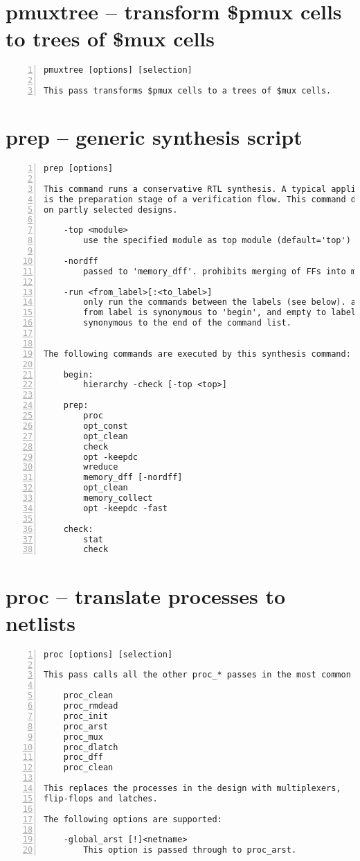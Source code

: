 \section{pmuxtree -- transform \$pmux cells to trees of \$mux cells}
\label{cmd:pmuxtree}
\begin{lstlisting}[numbers=left,frame=single]
    pmuxtree [options] [selection]

This pass transforms $pmux cells to a trees of $mux cells.
\end{lstlisting}

\section{prep -- generic synthesis script}
\label{cmd:prep}
\begin{lstlisting}[numbers=left,frame=single]
    prep [options]

This command runs a conservative RTL synthesis. A typical application for this
is the preparation stage of a verification flow. This command does not operate
on partly selected designs.

    -top <module>
        use the specified module as top module (default='top')

    -nordff
        passed to 'memory_dff'. prohibits merging of FFs into memory read ports

    -run <from_label>[:<to_label>]
        only run the commands between the labels (see below). an empty
        from label is synonymous to 'begin', and empty to label is
        synonymous to the end of the command list.


The following commands are executed by this synthesis command:

    begin:
        hierarchy -check [-top <top>]

    prep:
        proc
        opt_const
        opt_clean
        check
        opt -keepdc
        wreduce
        memory_dff [-nordff]
        opt_clean
        memory_collect
        opt -keepdc -fast

    check:
        stat
        check
\end{lstlisting}

\section{proc -- translate processes to netlists}
\label{cmd:proc}
\begin{lstlisting}[numbers=left,frame=single]
    proc [options] [selection]

This pass calls all the other proc_* passes in the most common order.

    proc_clean
    proc_rmdead
    proc_init
    proc_arst
    proc_mux
    proc_dlatch
    proc_dff
    proc_clean

This replaces the processes in the design with multiplexers,
flip-flops and latches.

The following options are supported:

    -global_arst [!]<netname>
        This option is passed through to proc_arst.
\end{lstlisting}


